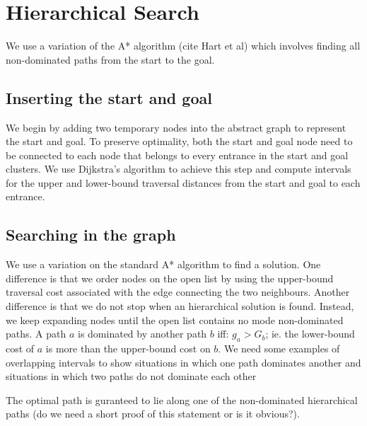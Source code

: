 \section{Hierarchical Search}
\label{ia-sec:hierarchicalsearch}
We use a variation of the A* algorithm (cite Hart  et al) which involves finding all non-dominated paths from the start to the goal.

\subsection{Inserting the start and goal}
We begin by adding two temporary nodes into the abstract graph to represent the start and goal.
To preserve optimality, both the start and goal node need to be connected to each node that belongs to every entrance in the start and goal clusters. 
We use Dijkstra's algorithm to achieve this step and compute intervals for the upper and lower-bound traversal distances from the start and goal to each entrance.

\subsection{Searching in the graph}
We use a variation on the standard A* algorithm to find a solution. 
One difference is that we order nodes on the open list by using the upper-bound traversal cost associated with the edge connecting the two neighbours. 
Another difference is that we do not stop when an hierarchical solution is found. 
Instead, we keep expanding nodes until the open list contains no mode non-dominated paths.
A path $a$ is dominated by another path $b$ iff: $g_{a} > G_{b}$; ie. the lower-bound cost of $a$ is more than the upper-bound cost on $b$.
We need some examples of overlapping intervals to show situations in which one path dominates another and situations in which two paths do not dominate each other
\par
The optimal path is guranteed to lie along one of the non-dominated hierarchical paths (do we need a short proof of this statement or is it obvious?).
